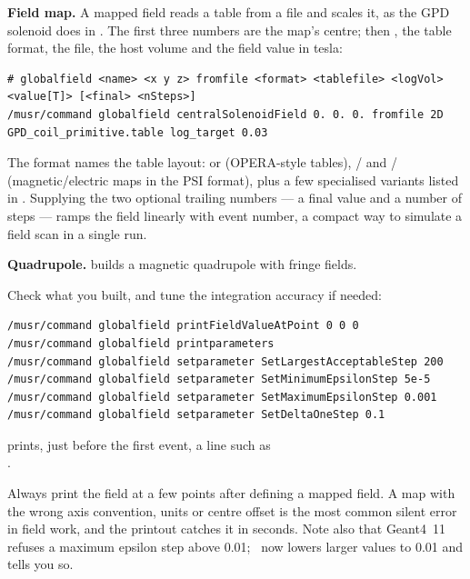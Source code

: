 \textbf{Field map.} A mapped field reads a table from a file and scales it, as the GPD solenoid does in . The first three numbers are the map's centre; then , the table format, the file, the host volume and the field value in tesla:

\begin{lstlisting}[style=mac,caption={A solenoid field from a 2-D field map (from \texttt{201.mac})}]
# globalfield <name> <x y z> fromfile <format> <tablefile> <logVol> <value[T]> [<final> <nSteps>]
/musr/command globalfield centralSolenoidField 0. 0. 0. fromfile 2D GPD_coil_primitive.table log_target 0.03
\end{lstlisting}

The format names the table layout:  or  (OPERA-style tables), / and / (magnetic/electric maps in the PSI format), plus a few specialised variants listed in . Supplying the two optional trailing numbers --- a final value and a number of steps --- ramps the field linearly with event number, a compact way to simulate a field scan in a single run.

\textbf{Quadrupole.}  builds a magnetic quadrupole with fringe fields.

Check what you built, and tune the integration accuracy if needed:

\begin{lstlisting}[style=mac,caption={Verifying the field and tuning the stepping accuracy}]
/musr/command globalfield printFieldValueAtPoint 0 0 0
/musr/command globalfield printparameters
/musr/command globalfield setparameter SetLargestAcceptableStep 200
/musr/command globalfield setparameter SetMinimumEpsilonStep 5e-5
/musr/command globalfield setparameter SetMaximumEpsilonStep 0.001
/musr/command globalfield setparameter SetDeltaOneStep 0.1
\end{lstlisting}

 prints, just before the first event, a line such as\\
.

\begin{checkbuild}
Always print the field at a few points after defining a mapped field. A map with the wrong axis convention, units or centre offset is the most common silent error in field work, and the printout catches it in seconds. Note also that Geant4~11 refuses a maximum epsilon step above 0.01; \musrSim\ now lowers larger values to 0.01 and tells you so.
\end{checkbuild}

